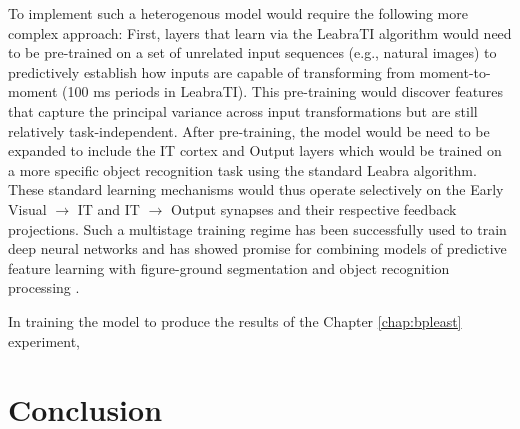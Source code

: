 \documentclass[dwyatte_dissertation.tex]{subfiles}
\begin{document}
To implement such a heterogenous model would require the following more complex approach: First, layers that learn via the LeabraTI algorithm would need to be pre-trained on a set of unrelated input sequences (e.g., natural images) to predictively establish how inputs are capable of transforming from moment-to-moment (100 ms periods in LeabraTI). This pre-training would discover features that capture the principal variance across input transformations but are still relatively task-independent. After pre-training, the model would be need to be expanded to include the IT cortex and Output layers which would be trained on a more specific object recognition task using the standard Leabra algorithm.  These standard learning mechanisms would thus operate selectively on the Early Visual $\rightarrow$ IT and IT $\rightarrow$ Output synapses and their respective feedback projections. Such a multistage training regime has been successfully used to train deep neural networks \cite{HintonSalakhutdinov06} and has showed promise for combining models of predictive feature learning with figure-ground segmentation and object recognition processing \cite{OReillyWyatteRohrlichEtAlInPrep}.


In training the model to produce the results of the Chapter \ref{chap:bpleast} experiment, 
% 


\section{Conclusion}



\end{document}
